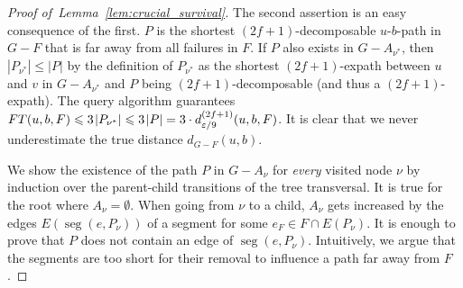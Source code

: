 \documentclass{theoretics}
\DeclareMathOperator{\seg}{seg}
\newcommand*{\length}[1]{|#1|}
\newcommand*{\nwspace}{\hspace*{.1em}}
\renewcommand{\le}{\leqslant}
\newcommand{\eps}{\varepsilon}
\begin{document}
\begin{proof}[Proof of~Lemma~\ref{lem:crucial_survival}]
  The second assertion is an easy consequence of the first.
  $P$ is the shortest $(2f{+}1)$-decomposable $u$-$b$-path in $G-F$ 
  that is far away from all failures in $F$.
  If $P$ also exists in $G-A_{\nu^*}$,
  then $\length{P_{\nu^*}} \le \length{P}$ by the definition of $P_{\nu^*}$
  as the shortest $(2f{+}1)$-expath between $u$ and $v$ in $G-A_{\nu^*}$
  and $P$ being $(2f{+}1)$-decomposable (and thus a $(2f{+}1)$-expath).
  The query algorithm guarantees
  $FT(u,b,F) \le 3 \nwspace \length{P_{\nu^*}} 
    \le 3 \nwspace \length{P} 
    = 3 \cdot d^{(2f+1)}_{\eps/9}(u,b,F)$.
  It is clear that we never underestimate the true distance $d_{G-F}(u,b)$.
  
  We show the existence of the path $P$ in $G-A_{\nu}$ for \emph{every} visited node $\nu$
  by induction over the parent-child transitions of the tree transversal.
  It is true for the root where $A_{\nu} = \emptyset$.
  When going from $\nu$ to a child, $A_{\nu}$ gets increased by
  the edges $E(\seg(e,P_{\nu}))$
  of a segment for some $e_F \in F \cap E(P_{\nu})$.
  It is enough to prove that $P$ does not contain an edge of $\seg(e,P_{\nu})$.
  Intuitively, we argue that the segments are too short
  for their removal to influence a path far away from $F$.
  

\end{proof}
\end{document}
